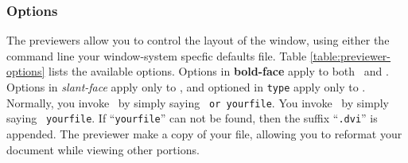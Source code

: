 \subsubsection{Options}
The previewers
allow you to control the layout of the window, using either
the command line your window-system specfic defaults file.
Table \ref{table:previewer-options} lists the available options.
Options in {\bf bold-face} apply to both \texx\ and \texsun.
Options in {\sl slant-face} apply only to \texx,
and optioned in {\tt type} apply only to \texsun.
Normally, you invoke \texx\ by simply saying {\tt \texx\ or \texsun  yourfile}.
You invoke \texsun\ by simply saying {\tt \texsun\ yourfile}.
If ``{\tt yourfile}'' can not be found, then the suffix ``{\tt .dvi}''
is appended.
The previewer make a copy of your file, allowing you to reformat your
document while viewing other portions.
%
